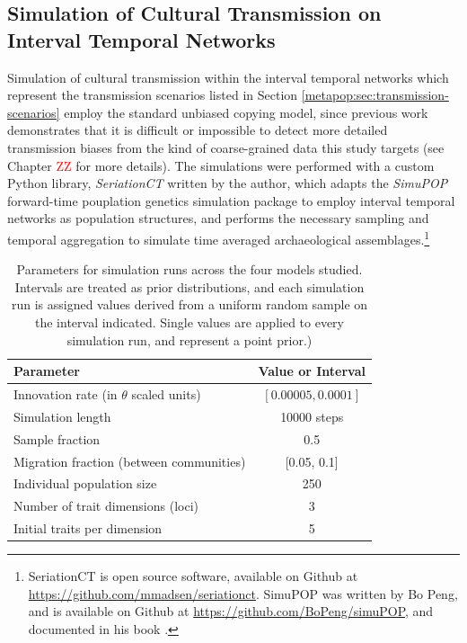     \subsection{Simulation of Cultural Transmission on Interval Temporal Networks}\label{metapop:sec:simulation}
    
    Simulation of cultural transmission within the interval temporal networks which represent the transmission scenarios listed in Section \ref{metapop:sec:transmission-scenarios} employ the standard unbiased copying model, since previous work demonstrates that it is difficult or impossible to detect more detailed transmission biases from the kind of coarse-grained data this study targets (see Chapter \textcolor{red}{ZZ} for more details).  The simulations were performed with a custom Python library, \emph{SeriationCT} written by the author, which adapts the \emph{SimuPOP} forward-time pouplation genetics simulation package to employ interval temporal networks as population structures, and performs the necessary sampling and temporal aggregation to simulate time averaged archaeological assemblages.\footnote{SeriationCT is open source software, available on Github at \url{https://github.com/mmadsen/seriationct}.  SimuPOP was written by Bo Peng, and is available on Github at \url{https://github.com/BoPeng/simuPOP}, and documented in his book \citep{peng2012forward}.}
    
    \begin{table}[h]
    \begin{tabular}{lc}
    \hline
    Parameter & Value or Interval \\
    \hline
    Innovation rate (in $\theta$ scaled units)  & $[0.00005, 0.0001]$   \\
    Simulation length & 10000 steps \\
    Sample fraction & 0.5 \\
    Migration fraction (between communities) & [0.05, 0.1] \\
    Individual population size & 250 \\
    Number of trait dimensions (loci) & 3 \\
    Initial traits per dimension & 5 \\
    \hline
    \end{tabular}
    
    \caption{Parameters for simulation runs across the four models studied.  Intervals are treated as prior distributions, and each simulation run is assigned values derived from a uniform random sample on the interval indicated.  Single values are applied to every simulation run, and represent a point prior.)}
    \label{metapop:tab:simulation-parameters}
    \end{table}
    

